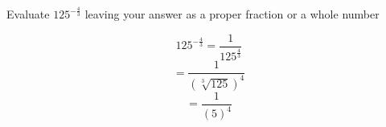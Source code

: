 \question Evaluate $125^{-\frac{4}{3}}$ leaving your answer as a proper fraction 
or a whole number
\begin{solution}
	\[
		125^{-\frac{4}{3}} = \frac{1}{125^{\tfrac{4}{3}}}
	\]
	\[
		= \frac{1}{ \left( \sqrt[3]{125} \right)^{4} }
	\]
	\[
		= \frac{1}{ \left( 5 \right)^{4} }
	\]
\end{solution}

